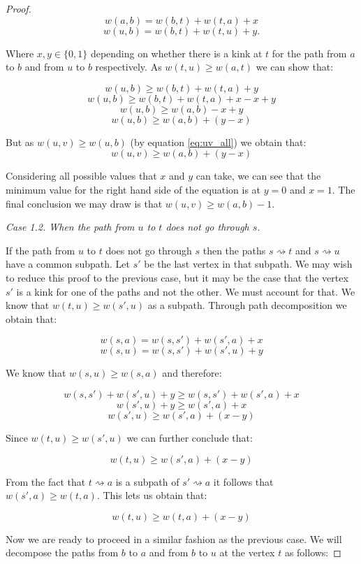 \begin{proof}
$$ w(a, b) = w(b, t) + w(t, a) + x  $$
$$ w(u, b) = w(b, t) + w(t, u) + y .$$

Where $x, y \in \{0, 1\}$ depending on whether there is a kink at $t$ for the path from $a$ to $b$ and from $u$ to $b$ respectively. As $w(t, u) \ge w(a, t)$ we can show that:


$$ w(u, b) \ge w(b, t) + w(t, a) + y $$
$$ w(u, b) \ge w(b, t) + w(t, a) + x - x + y $$
$$ w(u, b) \ge w(a, b) - x + y $$
$$ w(u, b) \ge w(a, b) + (y - x) $$

But as $w(u, v) \ge w(u, b)$ (by equation \ref{eq:uv_all}) we obtain that:
$$ w(u, v) \ge w(a, b) + (y - x) $$

Considering all possible values that $x$ and $y$ can take, we can see that the minimum value for the right hand side of the equation is at $y = 0$ and $x = 1$. The final conclusion we may draw is that $w(u, v) \ge w(a, b) -1$.




{\em Case 1.2. When the path from $u$ to $t$ does not go through $s$.}

If the path from $u$ to $t$ does not go through $s$ then the paths $s \rightsquigarrow t$ and $s \rightsquigarrow u$ have a common subpath. Let $s'$ be the last vertex in that subpath. We may wish to reduce this proof to the previous case, but it may be the case that the vertex $s'$ is a kink for one of the paths and not the other. We must account for that. We know that $w(t, u) \ge w(s', u)$ as a subpath. Through path decomposition we obtain that:

$$ w(s, a) = w(s, s') + w(s', a) + x $$
$$ w(s, u) = w(s, s') + w(s', u) + y $$

We know that $w(s, u) \ge w(s, a)$ and therefore:

$$ w(s, s') + w(s', u) + y \ge w(s, s') + w(s', a) + x  $$ 
$$ w(s', u) + y \ge w(s', a) + x $$ 
$$ w(s', u) \ge w(s', a) + (x - y)$$ 

Since $w(t, u) \ge w(s', u)$ we can further conclude that:

$$ w(t, u) \ge w(s', a) + (x - y)$$ 

From the fact that $t \rightsquigarrow a$ is a subpath of $s' \rightsquigarrow a$ it follows that $w(s', a) \ge w(t, a)$. This lets us obtain that:

$$ w(t, u) \ge w(t, a) + (x - y)$$ 

Now we are ready to proceed in a similar fashion as the previous case. We will decompose the paths from $b$ to $a$ and from $b$ to $u$ at the vertex $t$ as follows:


\end{proof}
